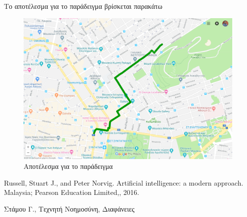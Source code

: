 \documentclass[a4paper,oneside,12pt]{article}
\begin{document}
Το αποτέλεσμα για το παράδειγμα βρίσκεται παρακάτω
\begin{figure}
    \centering
    \includegraphics[scale=0.5]{example.png}
    \caption{Αποτέλεσμα για το παράδειγμα}
    \label{fig:my_label}
\end{figure}



\begin{thebibliography}{9}

 Russell, Stuart J., and Peter Norvig. Artificial intelligence: a modern approach. Malaysia; Pearson Education Limited,, 2016.

 Στάμου Γ., Τεχνητή Νοημοσύνη, Διαφάνειες

\end{thebibliography}
\end{document}
